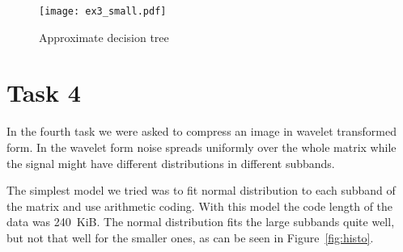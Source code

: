 \documentclass{article}
\begin{document}
\begin{figure}
    \begin{center}
	\texttt{[image: ex3\_small.pdf]}
    \end{center}
    \caption{Approximate decision tree}\label{fig:ex3small}
\end{figure}

\section{Task 4}

In the fourth task we were asked to compress an image in wavelet transformed form. In the wavelet form noise spreads
uniformly over the whole matrix while the signal might have different distributions in different subbands.

The simplest model we tried was to fit normal distribution to each subband of the matrix and use arithmetic coding.
With this model the code length of the data was 240~KiB. The normal distribution fits the large subbands quite well, but not that well for the smaller ones, as can be seen in Figure~\ref{fig:histo}.
\end{document}
